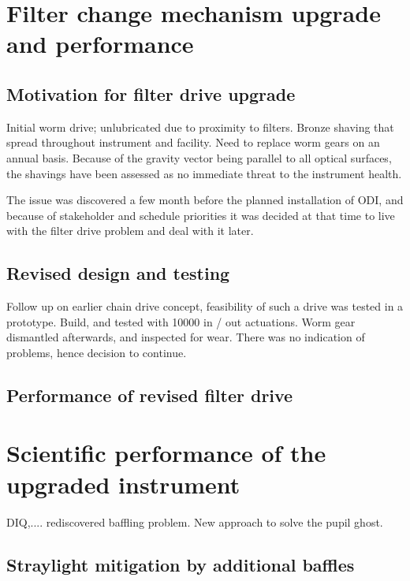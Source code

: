 \documentclass[draft]{spieman}
\begin{document}
\section{Filter change mechanism upgrade and performance}

\subsection{Motivation for filter drive upgrade} Initial worm drive;
unlubricated due to proximity to filters. Bronze shaving that spread
throughout instrument and facility.  Need to replace worm gears on an annual
basis. Because of the gravity vector being parallel to all optical surfaces,
the shavings have been assessed as no immediate threat to the instrument
health.

The issue was discovered a few month before the planned installation of ODI,
and because of stakeholder and schedule priorities it was decided at that
time to live with the filter drive problem and deal with it later.

\subsection{Revised design and testing}

Follow up on earlier chain drive concept, feasibility of such a drive was
tested in a prototype. Build, and tested with 10000 in / out actuations.
Worm gear dismantled afterwards, and inspected for wear. There was no
indication of problems, hence decision to continue.


\subsection{Performance of revised filter drive}






\section{Scientific performance of the upgraded instrument}

DIQ,.... rediscovered baffling problem. New approach to solve the pupil ghost.


\subsection{Straylight mitigation by additional baffles}
\end{document}
